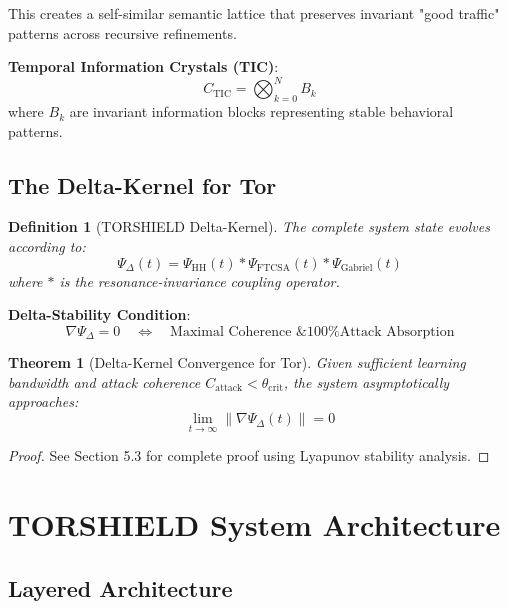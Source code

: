 \documentclass[11pt,a4paper]{article}
\newtheorem{theorem}{Theorem}[section]
\newtheorem{definition}{Definition}[section]
\begin{document}
This creates a self-similar semantic lattice that preserves invariant "good traffic" patterns across recursive refinements.

\textbf{Temporal Information Crystals (TIC)}:
\begin{equation}
C_{\text{TIC}} = \bigotimes_{k=0}^{N} B_k
\end{equation}
where $B_k$ are invariant information blocks representing stable behavioral patterns.

\subsection{The Delta-Kernel for Tor}

\begin{definition}[TORSHIELD Delta-Kernel]
The complete system state evolves according to:
\begin{equation}
\Psi_\Delta(t) = \Psi_{\text{HH}}(t) * \Psi_{\text{FTCSA}}(t) * \Psi_{\text{Gabriel}}(t)
\end{equation}
where $*$ is the resonance-invariance coupling operator.
\end{definition}

\textbf{Delta-Stability Condition}:
\begin{equation}
\nabla \Psi_\Delta = 0 \quad \Leftrightarrow \quad \text{Maximal Coherence \& 100\% Attack Absorption}
\end{equation}

\begin{theorem}[Delta-Kernel Convergence for Tor]
Given sufficient learning bandwidth and attack coherence $C_{\text{attack}} < \theta_{\text{crit}}$, the system asymptotically approaches:
\begin{equation}
\lim_{t \to \infty} \|\nabla \Psi_\Delta(t)\| = 0
\end{equation}
\end{theorem}

\begin{proof}
See Section 5.3 for complete proof using Lyapunov stability analysis.
\end{proof}

\newpage
\section{TORSHIELD System Architecture}

\subsection{Layered Architecture}
\end{document}
